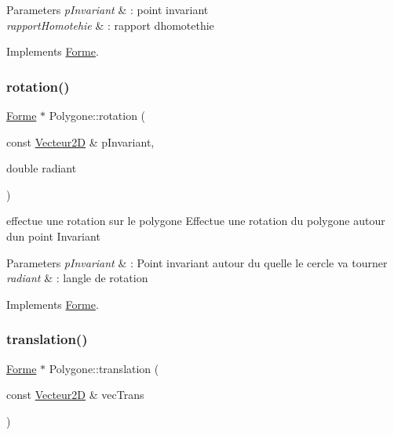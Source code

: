 \begin{DoxyParams}{Parameters}
{\em p\+Invariant} & \+: point invariant \\
\hline
{\em rapport\+Homotehie} & \+: rapport d\textquotesingle{}homotethie \\
\hline
\end{DoxyParams}


Implements \mbox{\hyperlink{class_forme}{Forme}}.

\mbox{\label{class_polygone_a8d2a29722b3e3256fac28bc3e0af1136}} 
\subsubsection{\texorpdfstring{rotation()}{rotation()}}
{\footnotesize\ttfamily \mbox{\hyperlink{class_forme}{Forme}} $\ast$ Polygone\+::rotation (\begin{DoxyParamCaption}\item[{const \mbox{\hyperlink{class_vecteur2_d}{Vecteur2D}} \&}]{p\+Invariant,  }\item[{double}]{radiant }\end{DoxyParamCaption})\hspace{0.3cm}{\ttfamily [virtual]}}



effectue une rotation sur le polygone Effectue une rotation du polygone autour d\textquotesingle{}un point Invariant 


\begin{DoxyParams}{Parameters}
{\em p\+Invariant} & \+: Point invariant autour du quelle le cercle va tourner \\
\hline
{\em radiant} & \+: l\textquotesingle{}angle de rotation \\
\hline
\end{DoxyParams}


Implements \mbox{\hyperlink{class_forme}{Forme}}.

\mbox{\label{class_polygone_a3fa7127577c992041b80cb5dd7e56671}} 
\subsubsection{\texorpdfstring{translation()}{translation()}}
{\footnotesize\ttfamily \mbox{\hyperlink{class_forme}{Forme}} $\ast$ Polygone\+::translation (\begin{DoxyParamCaption}\item[{const \mbox{\hyperlink{class_vecteur2_d}{Vecteur2D}} \&}]{vec\+Trans }\end{DoxyParamCaption})\hspace{0.3cm}{\ttfamily [virtual]}}



